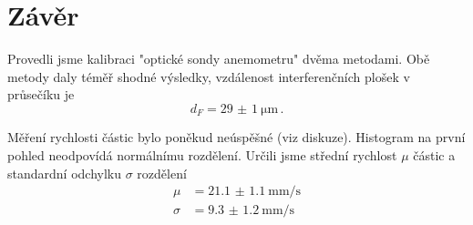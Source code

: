 \section*{Závěr}
Provedli jsme kalibraci "optické sondy anemometru" dvěma metodami. Obě metody daly téměř shodné výsledky, vzdálenost interferenčních plošek v průsečíku je
\begin{equation*}
d_F = \SI{29(1)}{\micro\m} \,.
\end{equation*}

Měření rychlosti částic bylo poněkud neúspěšné (viz diskuze). Histogram na první pohled neodpovídá normálnímu rozdělení. Určili jsme střední rychlost $\mu$ částic a standardní odchylku $\sigma$ rozdělení
\begin{align*}
\mu &= \SI{21.1(11)}{\mm\per\s}\\
\sigma &= \SI{9.3(12)}{\mm\per\s}
\end{align*}